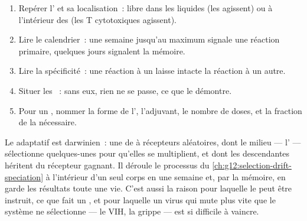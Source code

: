 \begin{method}\label{met:g12:adaptive-immunity:read}
\begin{enumerate}
  \item Repérer l' et sa localisation~: libre dans les
        liquides (les  agissent) ou à l'intérieur des
         (les  T cytotoxiques agissent).
  \item Lire le calendrier~: une semaine jusqu'au maximum signale une
        réaction primaire, quelques jours signalent la mémoire.
  \item Lire la spécificité~: une réaction à un  laisse
        intacte la réaction à un autre.
  \item Situer les ~: sans eux, rien ne se
        passe, ce que le  démontre.
  \item Pour un , nommer la forme de l', l'adjuvant, le
        nombre de doses, et la fraction de la  nécessaire.
\end{enumerate}
\end{method}

\begin{remark}\label{rem:g12:adaptive-immunity:selection}
Le  adaptatif est darwinien~: une  de
 à récepteurs aléatoires, dont le milieu ---
l' --- sélectionne quelques-unes pour qu'elles se multiplient,
et dont les descendantes héritent du récepteur gagnant. Il déroule le
processus du \cref{ch:g12:selection-drift-speciation} à l'intérieur
d'un seul corps en une semaine et, par la mémoire, en garde les
résultats toute une vie. C'est aussi la raison pour laquelle le
 peut être instruit, ce que fait un , et pour
laquelle un virus qui mute plus vite que le système ne
sélectionne --- le VIH, la grippe --- est si difficile à vaincre.
\end{remark}

